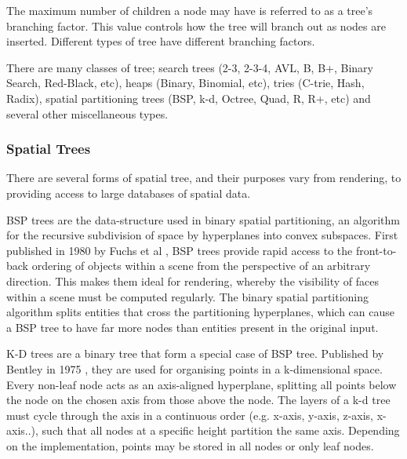     The maximum number of children a node may have is referred to as a tree's branching factor. This value controls how the tree will branch out as nodes are inserted. Different types of tree have different branching factors.

    There are many classes of tree; search trees (2-3, 2-3-4, AVL, B, B+, Binary Search, Red-Black, etc), heaps (Binary, Binomial, etc), tries (C-trie, Hash, Radix), spatial partitioning trees (BSP, k-d, Octree, Quad, R, R+, etc) and several other miscellaneous types. \begin{comment}B trees and their descendants are optimised for sequential data accesses, often used in databases.\end{comment}
    
    \subsubsection*{Spatial Trees}
      There are several forms of spatial tree, and their purposes vary from rendering, to providing access to large databases of spatial data.
      
      BSP trees are the data-structure used in binary spatial partitioning, an algorithm for the recursive subdivision of space by \glspl{hyperplane} into convex subspaces. First published in 1980 by Fuchs et al \cite{FKN80}, BSP trees provide rapid access to the front-to-back ordering of objects within a scene from the perspective of an arbitrary direction. This makes them ideal for rendering, whereby the visibility of faces within a scene must be computed regularly. The binary spatial partitioning algorithm splits entities that cross the partitioning \glspl{hyperplane}, which can cause a BSP tree to have far more nodes than entities present in the original input.
    
      K-D trees are a binary tree that form a special case of BSP tree. Published by Bentley in 1975 \cite{Ben75}, they are used for organising points in a k-dimensional space. Every non-leaf node acts as an axis-aligned \gls{hyperplane}, splitting all points below the node on the chosen axis from those above the node. The layers of a k-d tree must cycle through the axis in a continuous order (e.g. x-axis, y-axis, z-axis, x-axis..), such that all nodes at a specific height partition the same axis. Depending on the implementation, points may be stored in all nodes or only leaf nodes.
      

